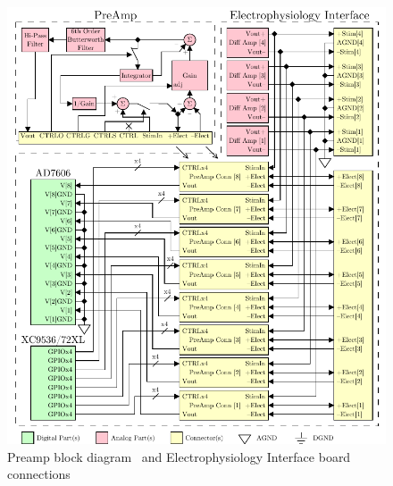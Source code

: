 \begin{figure}[h!]
	\centering 
		\includegraphics{./figures/PreAmpInt} 
	\caption{Preamp block diagram~\cite{Jimbo2003, StahlMSEE} and Electrophysiology Interface board connections\label{fig:PreampInt}}
\end{figure}

